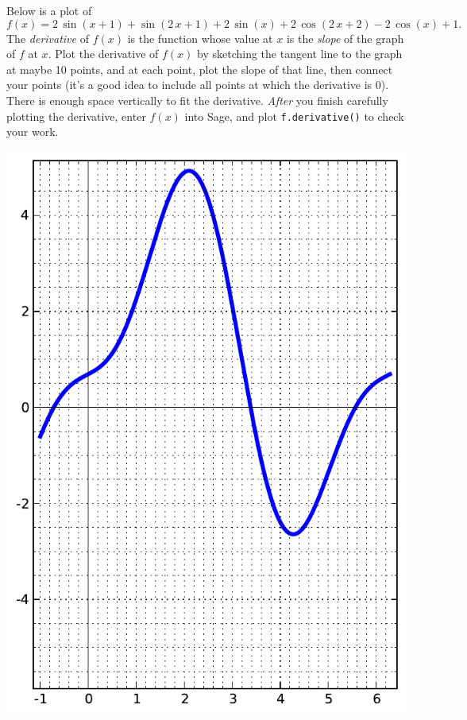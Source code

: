 Below is a plot of $$f(x)=2 \, \sin\left(x + 1\right) + \sin\left(2 \, x + 1\right) + 2 \, \sin\left(x\right) + 2 \, \cos\left(2 \, x + 2\right) - 2 \, \cos\left(x\right) + 1.$$  The {\em \color{red}derivative} of $f(x)$ is the function whose value at $x$ is the {\em slope} of the graph of $f$ at $x$.  Plot the derivative of $f(x)$ by sketching the tangent line to the graph at maybe 10 points, and at each point, plot the slope of that line, then connect your points (it's a good idea to include all points at which the derivative is 0).  There is enough space vertically to fit the derivative.  {\em After} you finish carefully plotting the derivative, enter $f(x)$ into Sage, and plot {\color{blue}\verb|f.derivative()|} to check your work.
\begin{center}\includegraphics{functions/93.pdf}\end{center}\newpage

